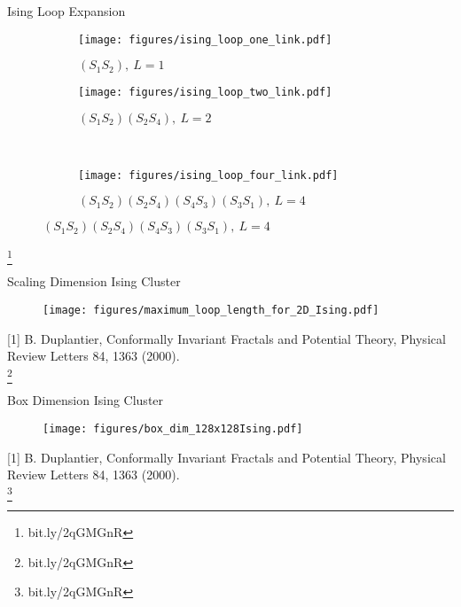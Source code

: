 \documentclass[10pt]{beamer}
\newcommand\blfootnote[1]{%
  \begingroup
  \renewcommand\thefootnote{}\footnote{#1}%
  \addtocounter{footnote}{-1}%
  \endgroup
}
\begin{document}
\begin{frame}{Ising Loop Expansion}
\begin{figure}[h!]
    \begin{subfigure}{.4\linewidth}
        \centering
        \texttt{[image: figures/ising\_loop\_one\_link.pdf]}
        \caption{$(S_1 S_2), \ L = 1$}
    \end{subfigure}%
    \begin{subfigure}{.4\linewidth}
        \centering
        \texttt{[image: figures/ising\_loop\_two\_link.pdf]}
        \caption{$(S_1 S_2)(S_2 S_4), \ L = 2$}
    \end{subfigure}\\[1ex]
    \begin{subfigure}{.8\linewidth}
        \centering
        \texttt{[image: figures/ising\_loop\_four\_link.pdf]}
        \caption{$(S_1 S_2)(S_2 S_4)(S_4 S_3)(S_3 S_1), \ L = 4$}
    \end{subfigure}
\end{figure}
\blfootnote{bit.ly/2qGMGnR}
\end{frame}

\begin{frame}{Scaling Dimension Ising Cluster}
    \begin{figure}[h!]
        \centering
            \texttt{[image: figures/maximum\_loop\_length\_for\_2D\_Ising.pdf]}
    \end{figure}
\footnotesize [1] B. Duplantier, Conformally Invariant Fractals and Potential Theory, Physical Review Letters 84, 1363 (2000).
\\
    \blfootnote{bit.ly/2qGMGnR}
\end{frame}

\begin{frame}{Box Dimension Ising Cluster}
    \begin{figure}[h!]
        \centering
            \texttt{[image: figures/box\_dim\_128x128Ising.pdf]}
    \end{figure}
\footnotesize [1] B. Duplantier, Conformally Invariant Fractals and Potential Theory, Physical Review Letters 84, 1363 (2000).
\\
    \blfootnote{bit.ly/2qGMGnR}
\end{frame}
\end{document}
